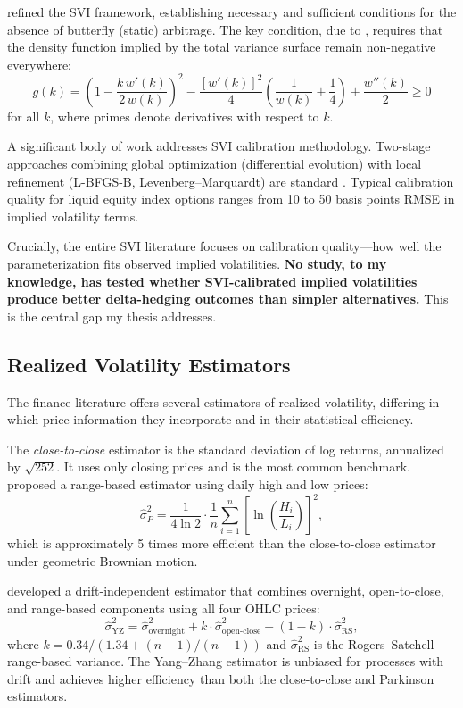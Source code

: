 \documentclass[12pt, letterpaper]{article}
\begin{document}
\citet{Gatheral2014} refined the SVI framework, establishing necessary and sufficient conditions for the absence of butterfly (static) arbitrage. The key condition, due to \citet{Durrleman2005}, requires that the density function implied by the total variance surface remain non-negative everywhere:
\begin{equation}
    g(k) = \left(1 - \frac{k\, w'(k)}{2\, w(k)}\right)^2 - \frac{[w'(k)]^2}{4}\left(\frac{1}{w(k)} + \frac{1}{4}\right) + \frac{w''(k)}{2} \geq 0
    \label{eq:durrleman}
\end{equation}
for all $k$, where primes denote derivatives with respect to $k$.

A significant body of work addresses SVI calibration methodology. Two-stage approaches combining global optimization (differential evolution) with local refinement (L-BFGS-B, Levenberg--Marquardt) are standard \citep{Storn1997}. Typical calibration quality for liquid equity index options ranges from 10 to 50 basis points RMSE in implied volatility terms.

Crucially, the entire SVI literature focuses on calibration quality---how well the parameterization fits observed implied volatilities. \textbf{No study, to my knowledge, has tested whether SVI-calibrated implied volatilities produce better delta-hedging outcomes than simpler alternatives.} This is the central gap my thesis addresses.

\subsection{Realized Volatility Estimators}

The finance literature offers several estimators of realized volatility, differing in which price information they incorporate and in their statistical efficiency.

The \textit{close-to-close} estimator is the standard deviation of log returns, annualized by $\sqrt{252}$. It uses only closing prices and is the most common benchmark. \citet{Parkinson1980} proposed a range-based estimator using daily high and low prices:
\begin{equation}
    \hat{\sigma}_P^2 = \frac{1}{4 \ln 2} \cdot \frac{1}{n} \sum_{i=1}^{n} \left[\ln\left(\frac{H_i}{L_i}\right)\right]^2,
    \label{eq:parkinson}
\end{equation}
which is approximately 5 times more efficient than the close-to-close estimator under geometric Brownian motion.

\citet{Yang2000} developed a drift-independent estimator that combines overnight, open-to-close, and range-based components using all four OHLC prices:
\begin{equation}
    \hat{\sigma}_{\text{YZ}}^2 = \hat{\sigma}_{\text{overnight}}^2 + k \cdot \hat{\sigma}_{\text{open-close}}^2 + (1 - k) \cdot \hat{\sigma}_{\text{RS}}^2,
    \label{eq:yangzhang}
\end{equation}
where $k = 0.34 / (1.34 + (n+1)/(n-1))$ and $\hat{\sigma}_{\text{RS}}^2$ is the Rogers--Satchell range-based variance. The Yang--Zhang estimator is unbiased for processes with drift and achieves higher efficiency than both the close-to-close and Parkinson estimators.
\end{document}
